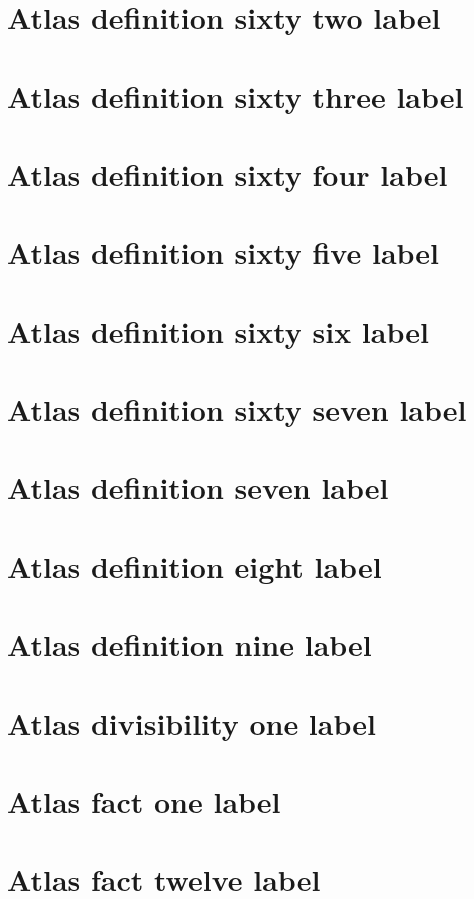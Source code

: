 \documentclass[11pt]{article}
\theoremstyle{definition}
\begin{document}
\section{Atlas definition sixty two label}
\label{ll:labels:atlas-d62}
\section{Atlas definition sixty three label}
\label{ll:labels:atlas-d63}
\section{Atlas definition sixty four label}
\label{ll:labels:atlas-d64}
\section{Atlas definition sixty five label}
\label{ll:labels:atlas-d65}
\section{Atlas definition sixty six label}
\label{ll:labels:atlas-d66}
\section{Atlas definition sixty seven label}
\label{ll:labels:atlas-d67}
\section{Atlas definition seven label}
\label{ll:labels:atlas-d7}
\section{Atlas definition eight label}
\label{ll:labels:atlas-d8}
\section{Atlas definition nine label}
\label{ll:labels:atlas-d9}
\section{Atlas divisibility one label}
\label{ll:labels:atlas-dv1}
\section{Atlas fact one label}
\label{ll:labels:atlas-f1}
\section{Atlas fact twelve label}
\label{ll:labels:atlas-f12}
\end{document}

